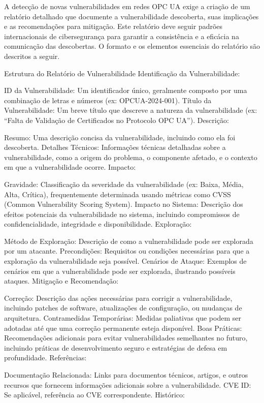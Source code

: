     {\color{red}
    A detecção de novas vulnerabilidades em redes OPC UA exige a criação de um relatório detalhado que documente a vulnerabilidade descoberta, suas implicações e as recomendações para mitigação. Este relatório deve seguir padrões internacionais de cibersegurança para garantir a consistência e a eficácia na comunicação das descobertas. O formato e os elementos essenciais do relatório são descritos a seguir.

    Estrutura do Relatório de Vulnerabilidade
    Identificação da Vulnerabilidade:

    ID da Vulnerabilidade: Um identificador único, geralmente composto por uma combinação de letras e números (ex: OPCUA-2024-001).
    Título da Vulnerabilidade: Um breve título que descreve a natureza da vulnerabilidade (ex: “Falta de Validação de Certificados no Protocolo OPC UA”).
    Descrição:

    Resumo: Uma descrição concisa da vulnerabilidade, incluindo como ela foi descoberta.
    Detalhes Técnicos: Informações técnicas detalhadas sobre a vulnerabilidade, como a origem do problema, o componente afetado, e o contexto em que a vulnerabilidade ocorre.
    Impacto:

    Gravidade: Classificação da severidade da vulnerabilidade (ex: Baixa, Média, Alta, Crítica), frequentemente determinada usando métricas como CVSS (Common Vulnerability Scoring System).
    Impacto no Sistema: Descrição dos efeitos potenciais da vulnerabilidade no sistema, incluindo compromissos de confidencialidade, integridade e disponibilidade.
    Exploração:

    Método de Exploração: Descrição de como a vulnerabilidade pode ser explorada por um atacante.
    Precondições: Requisitos ou condições necessárias para que a exploração da vulnerabilidade seja possível.
    Cenários de Ataque: Exemplos de cenários em que a vulnerabilidade pode ser explorada, ilustrando possíveis ataques.
    Mitigação e Recomendação:

    Correção: Descrição das ações necessárias para corrigir a vulnerabilidade, incluindo patches de software, atualizações de configuração, ou mudanças de arquitetura.
    Contramedidas Temporárias: Medidas paliativas que podem ser adotadas até que uma correção permanente esteja disponível.
    Boas Práticas: Recomendações adicionais para evitar vulnerabilidades semelhantes no futuro, incluindo práticas de desenvolvimento seguro e estratégias de defesa em profundidade.
    Referências:

    Documentação Relacionada: Links para documentos técnicos, artigos, e outros recursos que fornecem informações adicionais sobre a vulnerabilidade.
    CVE ID: Se aplicável, referência ao CVE correspondente.
    Histórico:

}
